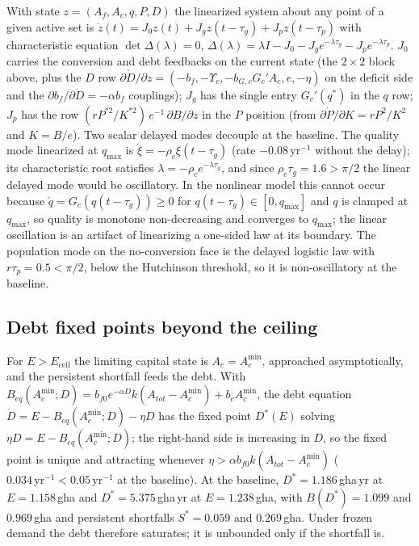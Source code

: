 \documentclass[11pt,a4paper]{article}
\newcommand{\Ups}{\Upsilon_c}
\newcommand{\Eceil}{E_{\mathrm{ceil}}}
\newcommand{\Acmin}{A_c^{\min}}
\begin{document}
With state $z=(A_f,A_c,q,P,D)$ the linearized system about any point of a given active set is $\dot z(t)=J_0z(t)+J_gz(t-\tau_g)+J_pz(t-\tau_p)$ with characteristic equation $\det\Delta(\lambda)=0$, $\Delta(\lambda)=\lambda I-J_0-J_ge^{-\lambda\tau_g}-J_pe^{-\lambda\tau_p}$. $J_0$ carries the conversion and debt feedbacks on the current state (the $2\times2$ block above, plus the $D$ row $\partial\dot D/\partial z=(-b_f,-\Ups,-b_{G,c}G_c'A_c,e,-\eta)$ on the deficit side and the $\partial b_f/\partial D=-\alpha b_f$ couplings); $J_g$ has the single entry $G_c'(q^*)$ in the $q$ row; $J_p$ has the row $(rP^{*2}/K^{*2})\,e^{-1}\,\partial B/\partial z$ in the $P$ position (from $\partial\dot P/\partial K=rP^2/K^2$ and $K=B/e$). Two scalar delayed modes decouple at the baseline. The quality mode linearized at $q_{\max}$ is $\dot\xi=-\rho_c\xi(t-\tau_g)$ (rate $-0.08\,\mathrm{yr}^{-1}$ without the delay); its characteristic root satisfies $\lambda=-\rho_ce^{-\lambda\tau_g}$, and since $\rho_c\tau_g=1.6>\pi/2$ the linear delayed mode would be oscillatory. In the nonlinear model this cannot occur because $\dot q=G_c(q(t-\tau_g))\ge0$ for $q(t-\tau_g)\in[0,q_{\max}]$ and $q$ is clamped at $q_{\max}$, so quality is monotone non-decreasing and converges to $q_{\max}$; the linear oscillation is an artifact of linearizing a one-sided law at its boundary. The population mode on the no-conversion face is the delayed logistic law with $r\tau_p=0.5<\pi/2$, below the Hutchinson threshold, so it is non-oscillatory at the baseline.

\subsection{Debt fixed points beyond the ceiling}\label{si:debt}

For $E>\Eceil$ the limiting capital state is $A_c=\Acmin$, approached asymptotically, and the persistent shortfall feeds the debt. With $B_{eq}(\Acmin;D)=b_{f0}e^{-\alpha D}k(A_{tot}-\Acmin)+b_c\Acmin$, the debt equation $\dot D=E-B_{eq}(\Acmin;D)-\eta D$ has the fixed point $D^*(E)$ solving $\eta D=E-B_{eq}(\Acmin;D)$; the right-hand side is increasing in $D$, so the fixed point is unique and attracting whenever $\eta>\alpha b_{f0}k(A_{tot}-\Acmin)$ ($0.034\,\mathrm{yr}^{-1}<0.05\,\mathrm{yr}^{-1}$ at the baseline). At the baseline, $D^*=1.186$\,gha\,yr at $E=1.158$\,gha and $D^*=5.375$\,gha\,yr at $E=1.238$\,gha, with $B(D^*)=1.099$ and $0.969$\,gha and persistent shortfalls $S^*=0.059$ and $0.269$\,gha. Under frozen demand the debt therefore saturates; it is unbounded only if the shortfall is.
\end{document}

